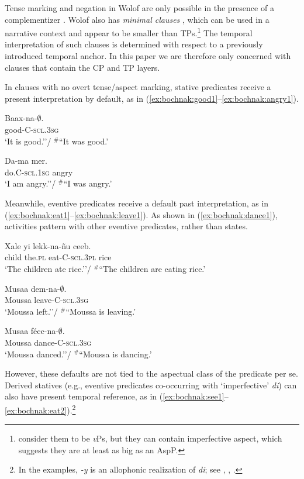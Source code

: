 \documentclass[output=paper,newtxmath,modfonts,nonflat,draftmode]{langsci/langscibook}
\begin{document}
 Tense marking and negation in Wolof are only
possible in the presence of a complementizer \citep{Njie1982}. Wolof
also has \textit{minimal clauses} \citep{Sauvageot1965,
  church81systeme,  Dialo1981, robert91approche,
  Zribi-HertzDiagne2003}, which can be used in a narrative context and
appear to be smaller than TPs.\footnote{\cite{Zribi-HertzDiagne2003} consider
them to be \textit{v}Ps, but they can contain imperfective aspect,
which suggests they are at least as big as an AspP.} The temporal interpretation of such
clauses is determined with respect to a previously introduced
temporal anchor. In this paper we
are therefore only concerned with clauses that contain the CP and TP layers.

In clauses with no overt tense/aspect marking, stative predicates receive a present interpretation by default, as in (\ref{ex:bochnak:good1}--\ref{ex:bochnak:angry1}).

\ea
\gll Baax-na-$\emptyset$.\\
good-C-\textsc{scl.3sg}\\
\glt `It is good.''/ $^{\#}$``It was good.'\label{ex:bochnak:good1}
\z

\ea
\gll Da-ma mer.\\
do.C-\textsc{scl.1sg} angry\\
\glt `I am angry.''/ $^{\#}$``I was angry.'\label{ex:bochnak:angry1}
\z

Meanwhile, eventive predicates receive a default past interpretation, as in (\ref{ex:bochnak:eat1}--\ref{ex:bochnak:leave1}). As shown in (\ref{ex:bochnak:dance1}), activities pattern with other eventive predicates, rather than states.

\ea
\gll Xale yi lekk-na-\~nu ceeb.\\
child the.\textsc{pl} eat-C-\textsc{scl.3pl} rice\\
\glt `The children ate rice.''/ $^{\#}$``The children are eating
  rice.'\label{ex:bochnak:eat1}
\z
 
\ea
\gll Musaa dem-na-$\emptyset$.\\
Moussa leave-C-\textsc{scl.3sg}\\
\glt `Moussa left.''/ $^{\#}$``Moussa is leaving.'\label{ex:bochnak:leave1}
\z

\ea
\gll Musaa f\'ecc-na-$\emptyset$.\\
Moussa dance-C-\textsc{scl.3sg}\\
\glt `Moussa danced.''/ $^{\#}$``Moussa is dancing.'\label{ex:bochnak:dance1}
\z

However, these defaults are not tied to the aspectual class of the predicate
per se. Derived statives (e.g., eventive predicates co-occurring with
`imperfective'  \textit{di}) can also have present temporal reference,
as in (\ref{ex:bochnak:see1}--\ref{ex:bochnak:eat2}).\footnote{In the examples, \textit{-y} is
an allophonic realization of \textit{di}; see \citealt{Dunigan1994}, \cite{Torrence2005, torrence12clause}, \cite{Martinovic2015b}.}
\end{document}
